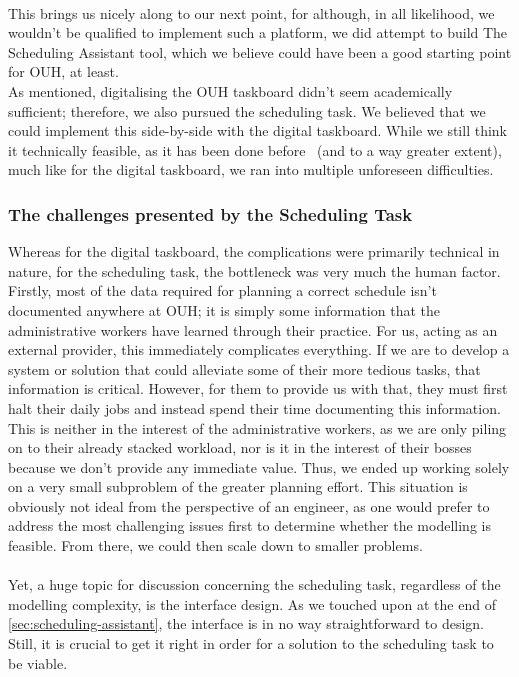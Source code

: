 \\
This brings us nicely along to our next point, for although, in all likelihood, we wouldn't be qualified to implement such a platform, we did attempt to build The Scheduling Assistant tool, which we believe could have been a good starting point for OUH, at least.
\\
As mentioned, digitalising the OUH taskboard didn't seem academically sufficient; therefore, we also pursued the scheduling task. We believed that we could implement this side-by-side with the digital taskboard. While we still think it technically feasible, as it has been done before~\cite{you-but-better} (and to a way greater extent), much like for the digital taskboard, we ran into multiple unforeseen difficulties.

\subsubsection*{The challenges presented by the Scheduling Task}
Whereas for the digital taskboard, the complications were primarily technical in nature, for the scheduling task, the bottleneck was very much the human factor.
\\
Firstly, most of the data required for planning a correct schedule isn't documented anywhere at OUH; it is simply some information that the administrative workers have learned through their practice. For us, acting as an external provider, this immediately complicates everything. If we are to develop a system or solution that could alleviate some of their more tedious tasks, that information is critical. However, for them to provide us with that, they must first halt their daily jobs and instead spend their time documenting this information. This is neither in the interest of the administrative workers, as we are only piling on to their already stacked workload, nor is it in the interest of their bosses because we don't provide any immediate value. Thus, we ended up working solely on a very small subproblem of the greater planning effort. This situation is obviously not ideal from the perspective of an engineer, as one would prefer to address the most challenging issues first to determine whether the modelling is feasible. From there, we could then scale down to smaller problems.
\\
\\
Yet, a huge topic for discussion concerning the scheduling task, regardless of the modelling complexity, is the interface design. As we touched upon at the end of \autoref{sec:scheduling-assistant}, the interface is in no way straightforward to design. Still, it is crucial to get it right in order for a solution to the scheduling task to be viable. 
